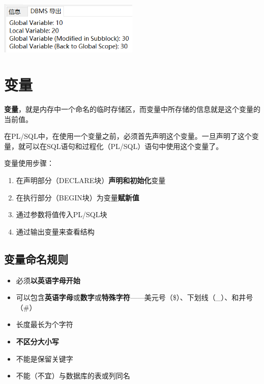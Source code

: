 \documentclass[11pt, a4paper, oneside, UTF8]{ctexbook}
\let\kaishu\relax %
\begin{document}
\begin{center}
  \begin{minipage}{\textwidth}
    \center
    \includegraphics[width=0.5\textwidth]{picture/嵌套程序块示例代码运行结果.png}
    \captionsetup{hypcap=false}
    \label{fig:嵌套程序块示例代码运行结果}
  \end{minipage}
\end{center}


\chapter{变量}
 {\bfseries\kaishu 变量}，就是内存中一个命名的临时存储区，而变量中所存储的信息就是这个变量的当前值。

在PL/SQL中，在使用一个变量之前，必须首先声明这个变量。一旦声明了这个变量，就可以在SQL语句和过程化（PL/SQL）语句中使用这个变量了。

变量使用步骤：
\begin{enumerate}
  \item 在声明部分（DECLARE块）\textbf{声明和初始化}变量
  \item 在执行部分（BEGIN块）为变量\textbf{赋新值}
  \item 通过参数将值传入PL/SQL块
  \item 通过输出变量来查看结构
\end{enumerate}
\section{变量命名规则}
\begin{itemize}
  \item 必须{\bfseries\kaishu 以英语字母开始}
  \item 可以包含{\bfseries\kaishu 英语字母}或{\bfseries\kaishu 数字}或{\bfseries\kaishu 特殊字符}——美元号（\$）、下划线（\_）、和井号（\#）
  \item 长度最长为{\bfseries\kaishu 30}个字符
  \item {\bfseries\kaishu 不区分大小写}
  \item 不能是保留关键字
  \item 不能（不宜）与数据库的表或列同名
\end{itemize}
\end{document}
